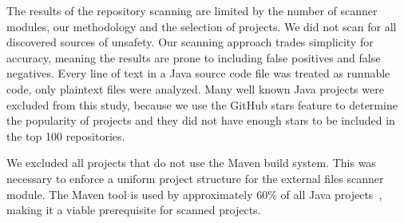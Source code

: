 The results of the repository scanning are limited by the number of scanner modules, our methodology
and the selection of projects. We did not scan for all discovered sources of unsafety. Our scanning
approach trades simplicity for accuracy, meaning the results are prone to including false positives
and false negatives.
Every line of text in a Java source code file was treated as runnable code, only plaintext files
were analyzed. Many well known Java projects were excluded from this study, because we use the GitHub stars
feature to determine the popularity of projects and they did not have enough stars to be included in
the top 100 repositories.

We excluded all projects that do not use the Maven build system. This was necessary to enforce a
uniform project structure for the external files scanner module. The Maven tool is used by
approximately 60\% of all Java projects~\cite{project_management_tools_report}, making it a viable prerequisite for scanned projects. 
